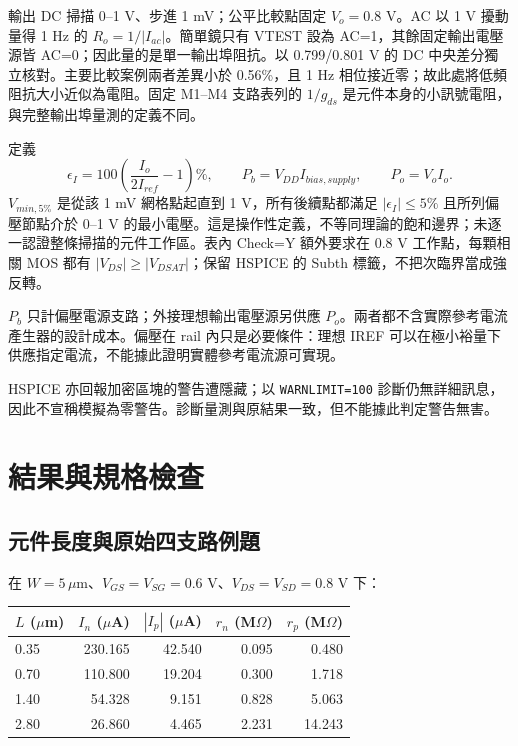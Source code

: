 輸出 DC 掃描 0--1 V、步進 1 mV；公平比較點固定 $V_o=0.8$ V。AC 以 1 V 擾動量得 1 Hz 的 $R_o=1/|I_{ac}|$。簡單鏡只有 VTEST 設為 AC=1，其餘固定輸出電壓源皆 AC=0；因此量的是單一輸出埠阻抗。以 0.799/0.801 V 的 DC 中央差分獨立核對。主要比較案例兩者差異小於 0.56\%，且 1 Hz 相位接近零；故此處將低頻阻抗大小近似為電阻。固定 M1--M4 支路表列的 $1/g_{ds}$ 是元件本身的小訊號電阻，與完整輸出埠量測的定義不同。

定義
\[
\epsilon_I=100\left(\frac{I_o}{2I_{ref}}-1\right)\%,\qquad
P_b=V_{DD}I_{bias,supply},\qquad P_o=V_oI_o.
\]
$V_{min,5\%}$ 是從該 1 mV 網格點起直到 1 V，所有後續點都滿足 $|\epsilon_I|\le5\%$ 且所列偏壓節點介於 0--1 V 的最小電壓。這是操作性定義，不等同理論的飽和邊界；未逐一認證整條掃描的元件工作區。表內 Check=Y 額外要求在 0.8 V 工作點，每顆相關 MOS 都有 $|V_{DS}|\ge|V_{DSAT}|$；保留 HSPICE 的 Subth 標籤，不把次臨界當成強反轉。

$P_b$ 只計偏壓電源支路；外接理想輸出電壓源另供應 $P_o$。兩者都不含實際參考電流產生器的設計成本。偏壓在 rail 內只是必要條件：理想 IREF 可以在極小裕量下供應指定電流，不能據此證明實體參考電流源可實現。

HSPICE 亦回報加密區塊的警告遭隱藏；以 \texttt{WARNLIMIT=100} 診斷仍無詳細訊息，因此不宣稱模擬為零警告。診斷量測與原結果一致，但不能據此判定警告無害。

\section{結果與規格檢查}
\subsection{元件長度與原始四支路例題}
在 $W=5\,\mu$m、$V_{GS}=V_{SG}=0.6$ V、$V_{DS}=V_{SD}=0.8$ V 下：

\begin{center}\small
\begin{tabular}{lrrrr}
\toprule
$L$ ($\mu$m) & $I_n$ ($\mu$A) & $|I_p|$ ($\mu$A) & $r_n$ (M$\Omega$) & $r_p$ (M$\Omega$) \\
\midrule
0.35 & 230.165 & 42.540 & 0.095 & 0.480 \\
0.70 & 110.800 & 19.204 & 0.300 & 1.718 \\
1.40 & 54.328 & 9.151 & 0.828 & 5.063 \\
2.80 & 26.860 & 4.465 & 2.231 & 14.243 \\
\bottomrule
\end{tabular}
\end{center}

